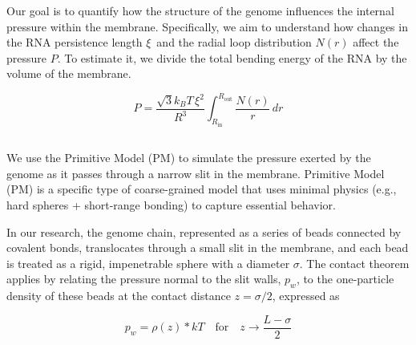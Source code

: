 \documentclass[12pt]{article}
\begin{document}
\begin{flushleft}
Our goal is to quantify how the structure of the genome influences the internal pressure within the membrane. Specifically, we aim to understand how changes in the RNA persistence length  \(\xi\)\ and the radial loop distribution \(N(r)\) affect the pressure \(P\).  To estimate it, we divide the total bending energy of the RNA by the volume of the membrane.  







\begin{equation}
P = \frac{\sqrt{3} k_B T \, \xi^2}{R^3} \int_{R_\text{in}}^{R_\text{out}} \frac{N(r)}{r} \, dr
\end{equation}

\subsection*{}
We use the Primitive Model (PM) to simulate the pressure exerted by the genome as it passes through a narrow slit in the membrane. Primitive Model (PM)	is a specific type of coarse-grained model that uses minimal physics (e.g., hard spheres + short-range bonding) to capture essential behavior.

 
In our research, the genome chain, represented as a series of beads connected by covalent bonds, translocates through a small slit in the membrane, and each bead is treated as a rigid, impenetrable sphere with a diameter $ \sigma $. The contact theorem\cite{Voertler1997} applies by relating the pressure normal to the slit walls, $ p_w $, to the one-particle density of these beads at the contact distance $ z = \sigma/2 $, expressed as 


\begin{equation}
{p_w}= \rho(z) *kT \quad \text{for} \quad z \to \frac{L - \sigma}{2}
\end{equation}



\end{flushleft}
\end{document}

